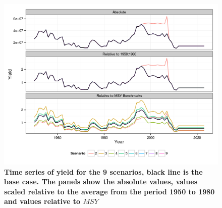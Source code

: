 \documentclass[a4paper, 10pt]{article}
\begin{document}
\begin{figure}[!ht]\begin{center} 
\includegraphics{../figs/om-yield.png}
\end{center}
\caption{\bf{Time series of yield for the 9 scenarios, black line is the base case. The panels show the absolute values, values scaled relative to 
the average from the period 1950 to 1980 and values relative to $MSY$}}
\label{ts-yield}\end{figure} 
\end{document}
